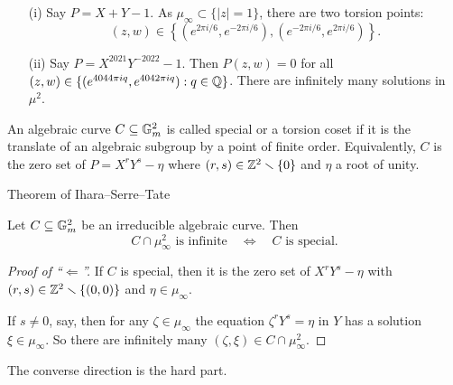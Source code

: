 \documentclass{beamer}
\begin{document}
\begin{frame}
  \begin{example}
    \begin{itemize}
    \item [(i)] Say $P = X+Y-1$. As $\mu_\infty \subset \{|z|=1\}$, 
      there are two torsion points:
      $$
      (z,w) \in \left\{ (e^{2\pi i/6},e^{-2\pi i/6}),(e^{-2\pi
          i/6},e^{2\pi i/6})\right\}.
      $$

    \item[(ii)] Say
      $P=X^{2021}Y^{-2022}-1$. Then
      $P(z,w)=0$ for all $(z,w)\in \{(e^{4044\pi iq},e^{4042\pi i
        q}) : q\in{\mathbb{Q}}\}$.
      There are infinitely many solutions in $\mu^2$.
    \end{itemize}
  \end{example}

  \begin{definition}
    An algebraic curve $C\subseteq {\mathbb{G}}_m^2$
    is called \alert{special} or a \alert{torsion coset} if it is the translate of an algebraic subgroup by
    a point of finite order. Equivalently,
    $C$  is the zero set of    $P=X^rY^s-\eta$ where $(r,s)\in{\mathbb{Z}}^2\smallsetminus\{0\}$
    and $\eta$ a root of unity. 
  \end{definition}
\end{frame}

\begin{frame}{Theorem of Ihara--Serre--Tate}
  \begin{theorem}
    Let $C\subseteq {\mathbb{G}}_m^2$ be an irreducible algebraic curve.
    Then
    \begin{equation*}
      C \cap \mu_\infty^2\text{ is infinite}\quad\Longleftrightarrow\quad \text{$C$ is special}. 
    \end{equation*}
  \end{theorem}

  \begin{proof}[Proof of ``$\Longleftarrow$'']
    If $C$ is special, then it is the zero set of $X^rY^s-\eta$ with
    $(r,s)\in{\mathbb{Z}}^2\smallsetminus\{(0,0)\}$ and $\eta\in \mu_\infty$.

    If $s\not=0$, say, then for any $\zeta\in\mu_\infty$ the equation
    $\zeta^r Y^s =\eta$ in $Y$ has a solution $\xi\in\mu_\infty$.
    So there are infinitely many $(\zeta,\xi)\in
    C\cap\mu_\infty^2$.     
  \end{proof}

  The converse direction is the hard part. 
\end{frame}
\end{document}
